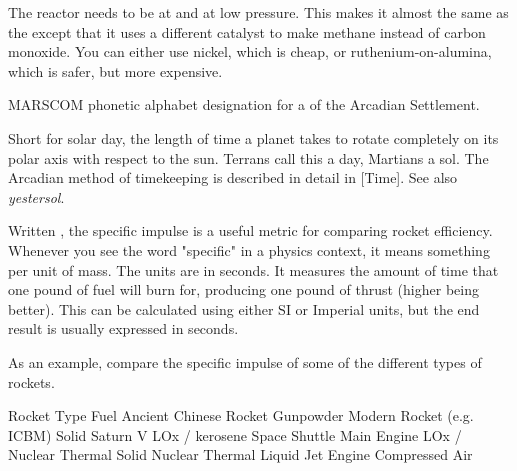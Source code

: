 {{{
\startformula
{}
\stopformula

The reactor needs to be at  and at low pressure. This makes it almost the same as the  except that it uses a different catalyst to make methane instead of carbon monoxide. You can either use nickel, which is cheap, or ruthenium-on-alumina, which is safer, but more expensive.
\stopdefinition

MARSCOM phonetic alphabet designation for a  of the Arcadian Settlement.
\stopdefinition

Short for solar day, the length of time a planet takes to rotate completely on its polar axis with respect to the sun. Terrans call this a day, Martians a sol. The Arcadian method of timekeeping is described in detail in [Time]. See also {\it yestersol}. 
\stopdefinition

Written , the specific impulse is a useful metric for comparing rocket efficiency. Whenever you see the word "specific" in a physics context, it means something per unit of mass. The units are in seconds. It measures the amount of time that one pound of fuel will burn for, producing one pound of thrust (higher being better). This can be calculated using either SI or Imperial units, but the end result is usually expressed in seconds. 

As an example, compare the specific impulse of some of the different types of rockets.

{
    \bTABLE[split=repeat,option=stretch]%
    \setupTABLE[row][each][align=center]

    \bTABLEhead
    \bTR
      \bTH Rocket Type \eTH
      \bTH Fuel \eTH
      \bTH {} \eTH
    \eTR
    \eTABLEhead
    \bTABLEbody
    \bTR
      \bTC Ancient Chinese Rocket \eTC
      \bTC Gunpowder \eTC
       \eTC
    \eTR
    \bTR
      \bTC Modern Rocket (e.g. ICBM) \eTC
      \bTC Solid \eTC
       \eTC
    \eTR
    \bTR
      \bTC Saturn V \eTC
      \bTC LOx / kerosene \eTC
       \eTC
    \eTR
    \bTR
      \bTC Space Shuttle Main Engine \eTC
      \bTC LOx /  \eTC
       \eTC
    \eTR
    \bTR
      \bTC Nuclear Thermal \eTC
      \bTC Solid \eTC
       \eTC
    \eTR
    \bTR
      \bTC Nuclear Thermal \eTC
      \bTC Liquid \eTC
       \eTC
    \eTR
    \bTR
      \bTC Jet Engine \eTC
      \bTC Compressed Air \eTC
       \eTC
    \eTR
\eTABLEbody
\eTABLE
}

}}}
